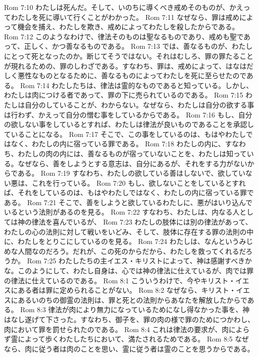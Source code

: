 Rom 7:10  わたしは死んだ。そして、いのちに導くべき戒めそのものが、かえってわたしを死に導いて行くことがわかった。
Rom 7:11  なぜなら、罪は戒めによって機会を捕え、わたしを欺き、戒めによってわたしを殺したからである。
Rom 7:12  このようなわけで、律法そのものは聖なるものであり、戒めも聖であって、正しく、かつ善なるものである。
Rom 7:13  では、善なるものが、わたしにとって死となったのか。断じてそうではない。それはむしろ、罪の罪たることが現れるための、罪のしわざである。すなわち、罪は、戒めによって、はなはだしく悪性なものとなるために、善なるものによってわたしを死に至らせたのである。
Rom 7:14  わたしたちは、律法は霊的なものであると知っている。しかし、わたしは肉につける者であって、罪の下に売られているのである。
Rom 7:15  わたしは自分のしていることが、わからない。なぜなら、わたしは自分の欲する事は行わず、かえって自分の憎む事をしているからである。
Rom 7:16  もし、自分の欲しない事をしているとすれば、わたしは律法が良いものであることを承認していることになる。
Rom 7:17  そこで、この事をしているのは、もはやわたしではなく、わたしの内に宿っている罪である。
Rom 7:18  わたしの内に、すなわち、わたしの肉の内には、善なるものが宿っていないことを、わたしは知っている。なぜなら、善をしようとする意志は、自分にあるが、それをする力がないからである。
Rom 7:19  すなわち、わたしの欲している善はしないで、欲していない悪は、これを行っている。
Rom 7:20  もし、欲しないことをしているとすれば、それをしているのは、もはやわたしではなく、わたしの内に宿っている罪である。
Rom 7:21  そこで、善をしようと欲しているわたしに、悪がはいり込んでいるという法則があるのを見る。
Rom 7:22  すなわち、わたしは、内なる人としては神の律法を喜んでいるが、
Rom 7:23  わたしの肢体には別の律法があって、わたしの心の法則に対して戦いをいどみ、そして、肢体に存在する罪の法則の中に、わたしをとりこにしているのを見る。
Rom 7:24  わたしは、なんというみじめな人間なのだろう。だれが、この死のからだから、わたしを救ってくれるだろうか。
Rom 7:25  わたしたちの主イエス・キリストによって、神は感謝すべきかな。このようにして、わたし自身は、心では神の律法に仕えているが、肉では罪の律法に仕えているのである。
Rom 8:1  こういうわけで、今やキリスト・イエスにある者は罪に定められることがない。
Rom 8:2  なぜなら、キリスト・イエスにあるいのちの御霊の法則は、罪と死との法則からあなたを解放したからである。
Rom 8:3  律法が肉により無力になっているためになし得なかった事を、神はなし遂げて下さった。すなわち、御子を、罪の肉の様で罪のためにつかわし、肉において罪を罰せられたのである。
Rom 8:4  これは律法の要求が、肉によらず霊によって歩くわたしたちにおいて、満たされるためである。
Rom 8:5  なぜなら、肉に従う者は肉のことを思い、霊に従う者は霊のことを思うからである。
